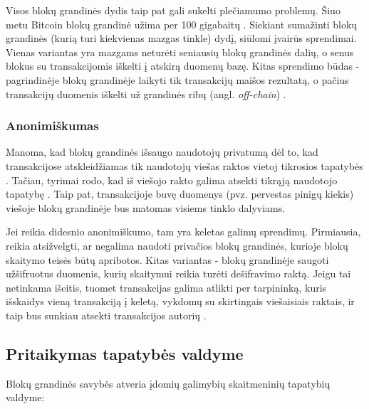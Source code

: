 Visos blokų grandinės dydis taip pat gali sukelti plečiamumo problemų. Šiuo metu Bitcoin blokų grandinė užima per 100 gigabaitų \cite{Zheng2017}. Siekiant sumažinti blokų grandinės
(kurią turi kiekvienas mazgas tinkle) dydį,
siūlomi įvairūs sprendimai. Vienas variantas yra mazgams neturėti seniausių blokų grandinės dalių, o senus blokus su transakcijomis iškelti į atskirą duomenų bazę.
Kitas sprendimo būdas - pagrindinėje blokų grandinėje laikyti tik transakcijų maišos rezultatą, o pačius transakcijų duomenis
iškelti už grandinės ribų (angl. \textit{off-chain}) \cite{Lo2017}.

\subsubsection{Anonimiškumas}

Manoma, kad blokų grandinės išsaugo naudotojų privatumą dėl to, kad transakcijose atskleidžiamas tik naudotojų
viešas raktos vietoj tikrosios tapatybės \cite{Zheng2017}. Tačiau, tyrimai rodo, kad iš viešojo rakto galima
atsekti tikrąją naudotojo tapatybę \cite{Barcelo2007}. Taip pat, transakcijoje buvę duomenys (pvz. pervestas pinigų kiekis)
viešoje blokų grandinėje bus matomas visiems tinklo dalyviams.

Jei reikia didesnio anonimiškumo, tam yra
keletas galimų sprendimų. Pirmiausia, reikia atsižvelgti, ar negalima naudoti privačios blokų grandinės, kurioje
blokų skaitymo teisės būtų apribotos. Kitas variantas - blokų grandinėje saugoti užšifruotus duomenis, kurių skaitymui
reikia turėti dešifravimo raktą. Jeigu tai netinkama išeitis, tuomet transakcijas galima atlikti per tarpininką, kuris išskaidys vieną transakciją
į keletą, vykdomų su skirtingais viešaisiais raktais, ir taip bus sunkiau atsekti transakcijos autorių \cite{Zheng2017}.

\subsection{Pritaikymas tapatybės valdyme}

Blokų grandinės savybės atveria įdomių galimybių skaitmeninių tapatybių valdyme:

